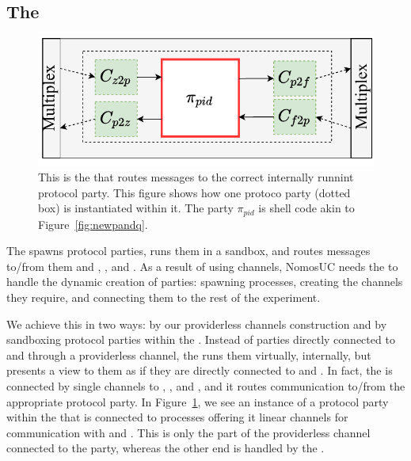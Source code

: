 \subsection{The \partywrapper}
\begin{figure}
	\centering
	\includegraphics[scale=0.5]{figures/singleshellmultiplex.pdf}
	\caption{This is the \partywrapper that routes messages to the correct internally runnint protocol party. This figure shows how one protoco party (dotted box) is instantiated within it. The party $\pi_{pid}$ is shell code akin to Figure~\ref{fig:newpandq}.}%
	\label{fig:singlemultiplex}
	\vspace{-3mm}
\end{figure}
The \partywrapper spawns protocol parties, runs them in a sandbox, and routes messages to/from them and \Z, \F, and \A.
As a result of using channels, NomosUC needs the \partywrapper to handle the dynamic creation of parties: spawning processes, creating the channels they require, and connecting them to the rest of the experiment.

We achieve this in two ways: by our providerless channels construction and by sandboxing protocol parties within the \partywrapper.
Instead of parties directly connected to \F and \Z through a providerless channel, the \partywrapper runs them virtually, internally, but presents a view to them as if they are directly connected to \F and \Z. 
In fact, the \partywrapper is connected by single channels to \F, \Z, and \A, and it routes communication to/from the appropriate protocol party. 
In Figure~\ref{fig:singlemultiplex}, we see an instance of a protocol party within the \partywrapper that is connected to processes offering it linear channels for communication with \Z and \F. 
This is only the part of the providerless channel connected to the party, whereas the other end is handled by the \partywrapper.

